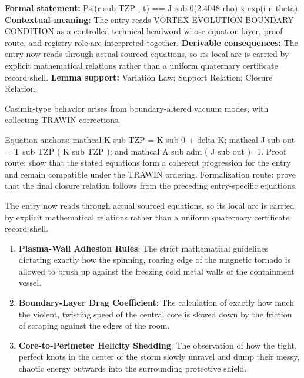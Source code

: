\begingroup\footnotesize\setlength{\emergencystretch}{3em}\sloppy
\textbf{Formal statement:} Psi(r sub TZP , t) == J sub 0(2.4048 rho) x exp(i n theta). \textbf{Contextual meaning:} The entry reads VORTEX EVOLUTION BOUNDARY CONDITION as a controlled technical headword whose equation layer, proof route, and registry role are interpreted together. \textbf{Derivable consequences:} The entry now reads through actual sourced equations, so its local arc is carried by explicit mathematical relations rather than a uniform quaternary certificate record shell. \textbf{Lemma support:} Variation Law; Support Relation; Closure Relation.\par
\endgroup

Casimir-type behavior arises from boundary-altered vacuum modes, with collecting TRAWIN corrections.

Equation anchors: mathcal K sub TZP = K sub 0 + delta K; mathcal J sub out = T sub TZP ( K sub TZP ); and mathcal A sub adm ( J sub out )=1. Proof route: show that the stated equations form a coherent progression for the entry and remain compatible under the TRAWIN ordering. Formalization route: prove that the final closure relation follows from the preceding entry-specific equations.

The entry now reads through actual sourced equations, so its local arc is carried by explicit mathematical relations rather than a uniform quaternary certificate record shell.
\endgroup

\begin{enumerate}[leftmargin=1.6em,itemsep=6pt,topsep=4pt]
\item \textbf{Plasma-Wall Adhesion Rules}: The strict mathematical guidelines dictating exactly how the spinning, roaring edge of the magnetic tornado is allowed to brush up against the freezing cold metal walls of the containment vessel.
\item \textbf{Boundary-Layer Drag Coefficient}: The calculation of exactly how much the violent, twisting speed of the central core is slowed down by the friction of scraping against the edges of the room.
\item \textbf{Core-to-Perimeter Helicity Shedding}: The observation of how the tight, perfect knots in the center of the storm slowly unravel and dump their messy, chaotic energy outwards into the surrounding protective shield.
\end{enumerate}

